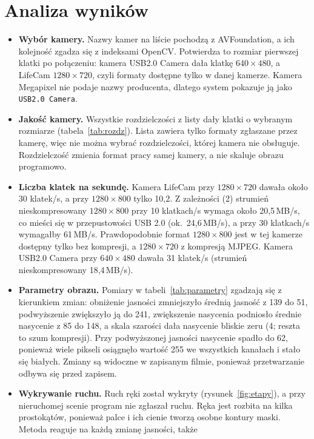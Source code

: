 \section{Analiza wyników}
\begin{itemize}
  \item \textbf{Wybór kamery.} Nazwy kamer na liście pochodzą z AVFoundation, a ich kolejność
    zgadza się z indeksami OpenCV. Potwierdza to rozmiar pierwszej klatki po połączeniu: kamera
    USB2.0 Camera dała klatkę $640\times480$, a LifeCam $1280\times720$, czyli formaty dostępne tylko
    w danej kamerze. Kamera Megapixel nie podaje nazwy producenta, dlatego system pokazuje ją jako
    \texttt{USB2.0 Camera}.
  \item \textbf{Jakość kamery.} Wszystkie rozdzielczości z listy dały klatki o wybranym rozmiarze
    (tabela~\ref{tab:rozdz}). Lista zawiera tylko formaty zgłaszane przez kamerę, więc nie można
    wybrać rozdzielczości, której kamera nie obsługuje. Rozdzielczość zmienia format pracy samej
    kamery, a nie skaluje obrazu programowo.
  \item \textbf{Liczba klatek na sekundę.} Kamera LifeCam przy $1280\times720$ dawała około 30
    klatek/s, a przy $1280\times800$ tylko 10,2. Z zależności (2) strumień nieskompresowany
    $1280\times800$ przy 10 klatkach/s wymaga około 20,5\,MB/s, co mieści się w przepustowości USB 2.0
    (ok.\ 24,6\,MB/s), a przy 30 klatkach/s wymagałby 61\,MB/s. Prawdopodobnie format $1280\times800$
    jest w tej kamerze dostępny tylko bez kompresji, a $1280\times720$ z kompresją MJPEG. Kamera
    USB2.0 Camera przy $640\times480$ dawała 31 klatek/s (strumień nieskompresowany 18,4\,MB/s).
  \item \textbf{Parametry obrazu.} Pomiary w tabeli~\ref{tab:parametry} zgadzają się z kierunkiem
    zmian: obniżenie jasności zmniejszyło średnią jasność z 139 do 51, podwyższenie zwiększyło ją
    do 241, zwiększenie nasycenia podniosło średnie nasycenie z 85 do 148, a skala szarości dała
    nasycenie bliskie zeru (4; reszta to szum kompresji). Przy podwyższonej jasności nasycenie
    spadło do 62, ponieważ wiele pikseli osiągnęło wartość 255 we wszystkich kanałach i stało się
    białych. Zmiany są widoczne w zapisanym filmie, ponieważ przetwarzanie odbywa się przed zapisem.
  \item \textbf{Wykrywanie ruchu.} Ruch ręki został wykryty (rysunek~\ref{fig:etapy}), a przy
    nieruchomej scenie program nie zgłaszał ruchu. Ręka jest rozbita na kilka prostokątów, ponieważ
    palce i ich cienie tworzą osobne kontury maski. Metoda reaguje na każdą zmianę jasności, także

\end{itemize}
